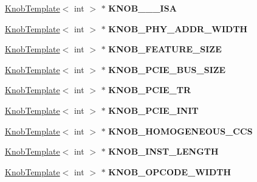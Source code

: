 \begin{DoxyCompactItemize}
\item 
\hypertarget{classall__knobs__c_a0bd21d87b8004f55f3a425a999a60f3b}{
\hyperlink{classKnobTemplate}{KnobTemplate}$<$ int $>$ $\ast$ {\bfseries KNOB\_\_\_\-ISA}}
\label{classall__knobs__c_a0bd21d87b8004f55f3a425a999a60f3b}

\item 
\hypertarget{classall__knobs__c_ab9ab850300de68dfbbbfbe1ed9827560}{
\hyperlink{classKnobTemplate}{KnobTemplate}$<$ int $>$ $\ast$ {\bfseries KNOB\_\-PHY\_\-ADDR\_\-WIDTH}}
\label{classall__knobs__c_ab9ab850300de68dfbbbfbe1ed9827560}

\item 
\hypertarget{classall__knobs__c_a373e0dbc24d6eb41570f833fc9d26528}{
\hyperlink{classKnobTemplate}{KnobTemplate}$<$ int $>$ $\ast$ {\bfseries KNOB\_\-FEATURE\_\-SIZE}}
\label{classall__knobs__c_a373e0dbc24d6eb41570f833fc9d26528}

\item 
\hypertarget{classall__knobs__c_aee6870710693c108d71bef0239660b08}{
\hyperlink{classKnobTemplate}{KnobTemplate}$<$ int $>$ $\ast$ {\bfseries KNOB\_\-PCIE\_\-BUS\_\-SIZE}}
\label{classall__knobs__c_aee6870710693c108d71bef0239660b08}

\item 
\hypertarget{classall__knobs__c_af2eda7cfeb6368d77efb3c7c9f59269a}{
\hyperlink{classKnobTemplate}{KnobTemplate}$<$ int $>$ $\ast$ {\bfseries KNOB\_\-PCIE\_\-TR}}
\label{classall__knobs__c_af2eda7cfeb6368d77efb3c7c9f59269a}

\item 
\hypertarget{classall__knobs__c_abf9d10c8460205ef536cd8f6663fdaad}{
\hyperlink{classKnobTemplate}{KnobTemplate}$<$ int $>$ $\ast$ {\bfseries KNOB\_\-PCIE\_\-INIT}}
\label{classall__knobs__c_abf9d10c8460205ef536cd8f6663fdaad}

\item 
\hypertarget{classall__knobs__c_a09fe5493b3f997b9795e6387744ec20b}{
\hyperlink{classKnobTemplate}{KnobTemplate}$<$ int $>$ $\ast$ {\bfseries KNOB\_\-HOMOGENEOUS\_\-CCS}}
\label{classall__knobs__c_a09fe5493b3f997b9795e6387744ec20b}

\item 
\hypertarget{classall__knobs__c_a5388b0c6d7ef8256f4b22313f9d70750}{
\hyperlink{classKnobTemplate}{KnobTemplate}$<$ int $>$ $\ast$ {\bfseries KNOB\_\-INST\_\-LENGTH}}
\label{classall__knobs__c_a5388b0c6d7ef8256f4b22313f9d70750}

\item 
\hypertarget{classall__knobs__c_a6714c4ef3291f6b553c1c0cc29f075e2}{
\hyperlink{classKnobTemplate}{KnobTemplate}$<$ int $>$ $\ast$ {\bfseries KNOB\_\-OPCODE\_\-WIDTH}}
\label{classall__knobs__c_a6714c4ef3291f6b553c1c0cc29f075e2}


\end{DoxyCompactItemize}
